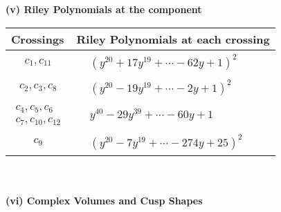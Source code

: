 \documentclass[1p]{elsarticle_modified}
\theoremstyle{definition}
\begin{document}
\newpage\renewcommand{\arraystretch}{1}
\flushleft \textbf{(v) Riley Polynomials at the component}\newline \\
\begin{tabular}{m{50pt}|m{274pt}}
Crossings & \hspace{64pt}Riley Polynomials at each crossing \\
\hline $$\begin{aligned}c_{1},c_{11}\end{aligned}$$&$\begin{aligned}
&(y^{20}+17 y^{19}+\cdots-62 y+1)^{2}
\end{aligned}$\\
\hline $$\begin{aligned}c_{2},c_{3},c_{8}\end{aligned}$$&$\begin{aligned}
&(y^{20}-19 y^{19}+\cdots-2 y+1)^{2}
\end{aligned}$\\
\hline $$\begin{aligned}c_{4},c_{5},c_{6}\\c_{7},c_{10},c_{12}\end{aligned}$$&$\begin{aligned}
&y^{40}-29 y^{39}+\cdots-60 y+1
\end{aligned}$\\
\hline $$\begin{aligned}c_{9}\end{aligned}$$&$\begin{aligned}
&(y^{20}-7 y^{19}+\cdots-274 y+25)^{2}
\end{aligned}$\\
\hline
\end{tabular}\\~\\
\newpage\flushleft \textbf{(vi) Complex Volumes and Cusp Shapes}
\end{document}
